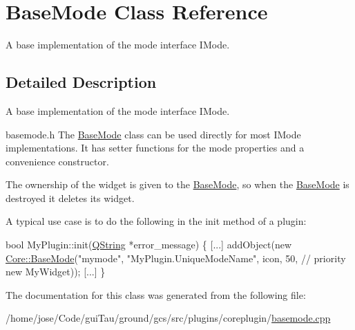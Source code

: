 \hypertarget{class_base_mode}{\section{Base\-Mode Class Reference}
\label{class_base_mode}
}


A base implementation of the mode interface I\-Mode.  




\subsection{Detailed Description}
A base implementation of the mode interface I\-Mode. 

basemode.\-h The \hyperlink{class_base_mode}{Base\-Mode} class can be used directly for most I\-Mode implementations. It has setter functions for the mode properties and a convenience constructor.

The ownership of the widget is given to the \hyperlink{class_base_mode}{Base\-Mode}, so when the \hyperlink{class_base_mode}{Base\-Mode} is destroyed it deletes its widget.

A typical use case is to do the following in the init method of a plugin\-: 
\begin{DoxyCode}
\textcolor{keywordtype}{bool} MyPlugin::init(\hyperlink{group___u_a_v_objects_plugin_gab9d252f49c333c94a72f97ce3105a32d}{QString} *error\_message)
\{
    [...]
    addObject(\textcolor{keyword}{new} \hyperlink{class_core_1_1_base_mode}{Core::BaseMode}(\textcolor{stringliteral}{"mymode"},
        \textcolor{stringliteral}{"MyPlugin.UniqueModeName"},
        icon,
        50, \textcolor{comment}{// priority}
        \textcolor{keyword}{new} MyWidget));
    [...]
\}
\end{DoxyCode}
 

The documentation for this class was generated from the following file\-:\begin{DoxyCompactItemize}
\item 
/home/jose/\-Code/gui\-Tau/ground/gcs/src/plugins/coreplugin/\hyperlink{basemode_8cpp}{basemode.\-cpp}\end{DoxyCompactItemize}
